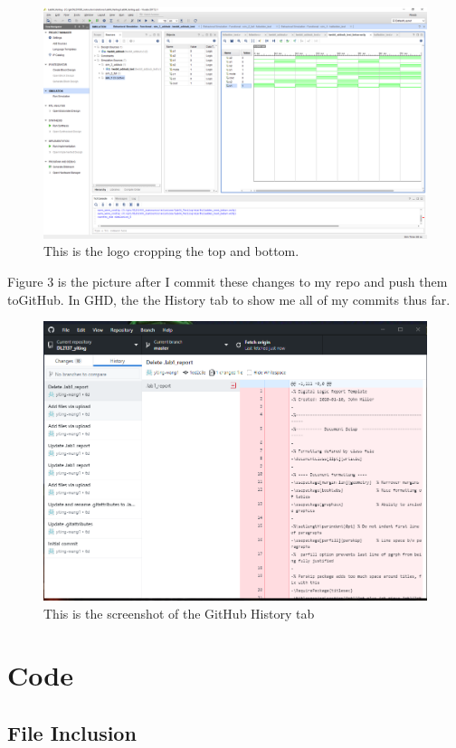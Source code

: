 \documentclass[11pt]{article}
\newcommand{\Verilog}[2][]{%
	
}
\begin{document}
	\begin{figure}[ht]\centering
		\includegraphics[width=1.0\textwidth,trim=8cm 8cm 0cm 0cm,clip]{Lab1Table}
		\caption{This is the logo cropping the top and bottom.}
		\label{fig:another_image}
	\end{figure}

	Figure 3 is the picture after I commit these changes to my repo and push them toGitHub. In GHD, the the History tab to show me all of my commits thus far.\\
	\begin{figure}[ht]\centering
		\includegraphics[width=1.0\textwidth]{GitHub}
		\caption{This is the screenshot of the GitHub History tab}
		\label{fig:GitHub}
	\end{figure}



\section*{Code}

\subsection*{File Inclusion}
\Verilog[caption=lab1_example Verilog code,label=code:file_ex]{lab1_example_code.sv}
\end{document}
